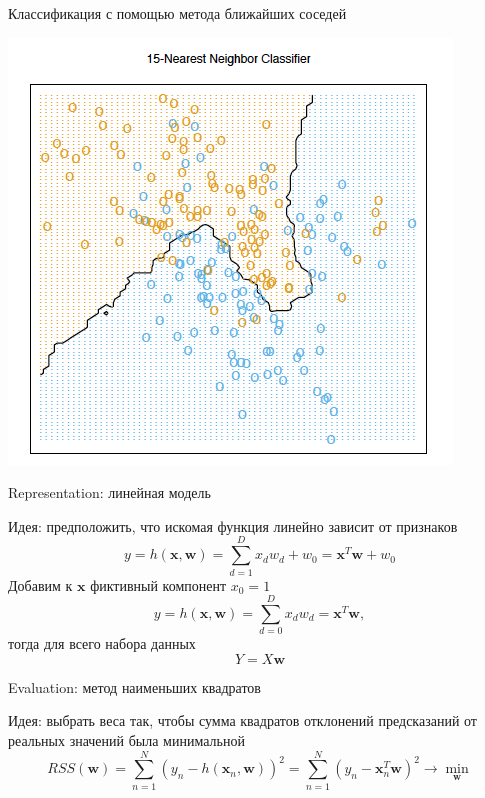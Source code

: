 \documentclass[aspectratio=169]{beamer}
\begin{document}
\begin{frame}{Классификация с помощью метода ближайших соседей}

\begin{center}
\includegraphics[height = 0.6\textheight]{images/knn_cls.png}
\end{center}

\end{frame}

\begin{frame}{Representation: линейная модель}

Идея: предположить, что искомая функция линейно зависит от признаков
\[
y = h(\mathbf{x}, \mathbf{w}) = \sum_{d=1}^D x_d w_d + w_0 = \mathbf{x}^T \mathbf{w} + w_0
\]
Добавим к $\mathbf{x}$ фиктивный компонент $x_0 = 1$
\[
y = h(\mathbf{x}, \mathbf{w}) = \sum_{d=0}^D x_d w_d = \mathbf{x}^T \mathbf{w},
\]
тогда для всего набора данных
\[
Y = X \mathbf{w}
\]

\end{frame}

\begin{frame}{Evaluation: метод наименьших квадратов}

Идея: выбрать веса так, чтобы сумма квадратов отклонений предсказаний от реальных значений была минимальной
\[
RSS(\mathbf{w}) = \sum_{n=1}^N (y_n - h(\mathbf{x}_n, \mathbf{w}))^2 = \sum_{n=1}^N (y_n - \mathbf{x}_n^T \mathbf{w})^2 \rightarrow \min_{\mathbf{w}}
\]

\end{frame}
\end{document}
